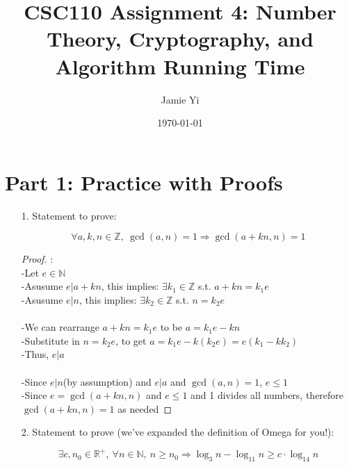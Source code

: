 \documentclass[fontsize=11pt]{article}
\title{CSC110 Assignment 4: Number Theory, Cryptography, and Algorithm Running Time}
\author{Jamie Yi}
\date{\today}
\newcommand{\N}{\mathbb{N}}
\newcommand{\Z}{\mathbb{Z}}
\newcommand{\R}{\mathbb{R}}
\begin{document}
\maketitle

\section*{Part 1: Practice with Proofs}

\begin{enumerate}

\item[1.] Statement to prove:

$$\forall a, k, n \in \Z,~ \gcd(a, n) = 1 \Rightarrow \gcd(a + kn, n) = 1$$

\begin{proof}
: \\ -Let $e \in \N$ \\
-Asusume $e|a + kn$, this implies: $\exists k_1 \in \Z$ s.t. $a + kn = k_1 e$ \\
-Asusume $e|n$, this implies: $\exists k_2 \in \Z$ s.t. $n = k_2 e$ \\~\\
-We can rearrange $a + kn = k_1 e$ to be $a = k_1 e - kn$ \\
-Substitute in $n = k_2 e$, to get $a = k_1 e - k(k_2 e) = e(k_1 - kk_2)$ \\
-Thus, $e|a$\\~\\
-Since $e|n$(by assumption) and $e|a$ and $\gcd(a, n) = 1$, $e \leq 1$ \\
-Since $ e = \gcd(a + kn, n)$ and $e \leq 1$ and 1 divides all numbers, therefore $\gcd(a + kn, n) = 1$ as needed

\end{proof}

\item[2.] Statement to prove (we've expanded the definition of Omega for you!):

$$\exists c, n_0 \in \R^+,~ \forall n \in \N,~ n \geq n_0 \Rightarrow \log_{3} n - \log_{11} n \geq c \cdot \log_{14} n$$


\end{enumerate}
\end{document}
